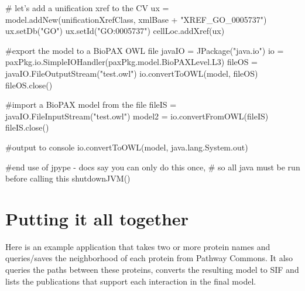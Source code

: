 \documentclass{tufte-book}
\begin{document}
\begin{fullwidth}
\begin{pythoncode}
# let's add a unification xref to the CV
ux = model.addNew(unificationXrefClass, xmlBase + "XREF_GO_0005737")
ux.setDb("GO")
ux.setId("GO:0005737")
cellLoc.addXref(ux)

#export the model to a BioPAX OWL file
javaIO = JPackage("java.io")
io = paxPkg.io.SimpleIOHandler(paxPkg.model.BioPAXLevel.L3)
fileOS = javaIO.FileOutputStream("test.owl")
io.convertToOWL(model, fileOS)
fileOS.close()

#import a BioPAX model from the file
fileIS = javaIO.FileInputStream("test.owl")
model2 = io.convertFromOWL(fileIS)
fileIS.close()

#output to console
io.convertToOWL(model, java.lang.System.out)

#end use of jpype - docs say you can only do this once,
# so all java must be run before calling this
shutdownJVM() 
\end{pythoncode}
\end{fullwidth}

\chapter{Putting it all together}

Here is an example application that takes two or more protein names and queries/saves the neighborhood of each protein from Pathway Commons. It also queries the paths between these proteins, converts the resulting model to SIF and lists the publications that support each interaction in the final model. 
\end{document}
